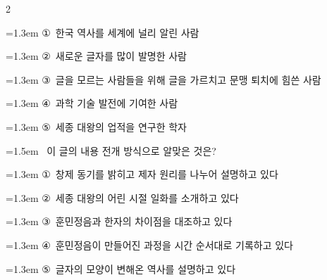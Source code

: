 \documentclass[11pt, a4paper]{article}
\begin{document}
\begin{multicols}{2}
\begin{minipage}{\columnwidth}
\vspace{0.5mm}
{\hangindent=1.3em  \noindent\hspace{0.3em}①~한국 역사를 세계에 널리 알린 사람\par}
{\hangindent=1.3em  \noindent\hspace{0.3em}②~새로운 글자를 많이 발명한 사람\par}
{\hangindent=1.3em  \noindent\hspace{0.3em}③~글을 모르는 사람들을 위해 글을 가르치고 문맹 퇴치에 힘쓴 사람\par}
{\hangindent=1.3em  \noindent\hspace{0.3em}④~과학 기술 발전에 기여한 사람\par}
{\hangindent=1.3em  \noindent\hspace{0.3em}⑤~세종 대왕의 업적을 연구한 학자\par}
\vspace{4mm}
\end{minipage}
\par

\noindent\begin{minipage}{\columnwidth}
\vspace{2mm}
{\hangindent=1.5em  ~이 글의 내용 전개 방식으로 알맞은 것은?\par}

\vspace{0.5mm}
{\hangindent=1.3em  \noindent\hspace{0.3em}①~창제 동기를 밝히고 제자 원리를 나누어 설명하고 있다\par}
{\hangindent=1.3em  \noindent\hspace{0.3em}②~세종 대왕의 어린 시절 일화를 소개하고 있다\par}
{\hangindent=1.3em  \noindent\hspace{0.3em}③~훈민정음과 한자의 차이점을 대조하고 있다\par}
{\hangindent=1.3em  \noindent\hspace{0.3em}④~훈민정음이 만들어진 과정을 시간 순서대로 기록하고 있다\par}
{\hangindent=1.3em  \noindent\hspace{0.3em}⑤~글자의 모양이 변해온 역사를 설명하고 있다\par}
\vspace{4mm}
\end{minipage}
\par


\end{multicols}
\end{document}
